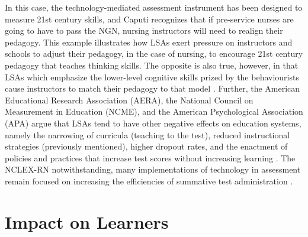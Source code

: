 \documentclass[
]{book}
\begin{document}
In this case, the technology-mediated assessment instrument has been designed to measure 21st century skills, and Caputi recognizes that if pre-service nurses are going to have to pass the NGN, nursing instructors will need to realign their pedagogy. This example illustrates how LSAs exert pressure on instructors and schools to adjust their pedagogy, in the case of nursing, to encourage 21st century pedagogy that teaches thinking skills. The opposite is also true, however, in that LSAs which emphasize the lower-level cognitive skills prized by the behaviourists cause instructors to match their pedagogy to that model \citep{caputiReflectionsNextGeneration2019, clarke-miduraAssessmentTechnologyChange2010, delucaExploringAssessmentCultures2021, pellegrinoPerspectivesIntegrationTechnology2010}. Further, the American Educational Research Association (AERA), the National Council on Measurement in Education (NCME), and the American Psychological Association (APA) argue that LSAs tend to have other negative effects on education systems, namely the narrowing of curricula (teaching to the test), reduced instructional strategies (previously mentioned), higher dropout rates, and the enactment of policies and practices that increase test scores without increasing learning \citeyearpar{aeraStandardsEducationalPsychological2014}. The NCLEX-RN notwithstanding, many implementations of technology in assessment remain focused on increasing the efficiencies of summative test administration \citep{broadfootAssessmentTwentyFirstCenturyLearning2016, pellegrinoPerspectivesIntegrationTechnology2010, webbAssessmentTwentyFirstCentury2018}.

\hypertarget{impact-on-learners}{%
\section*{Impact on Learners}\label{impact-on-learners}}
\end{document}
